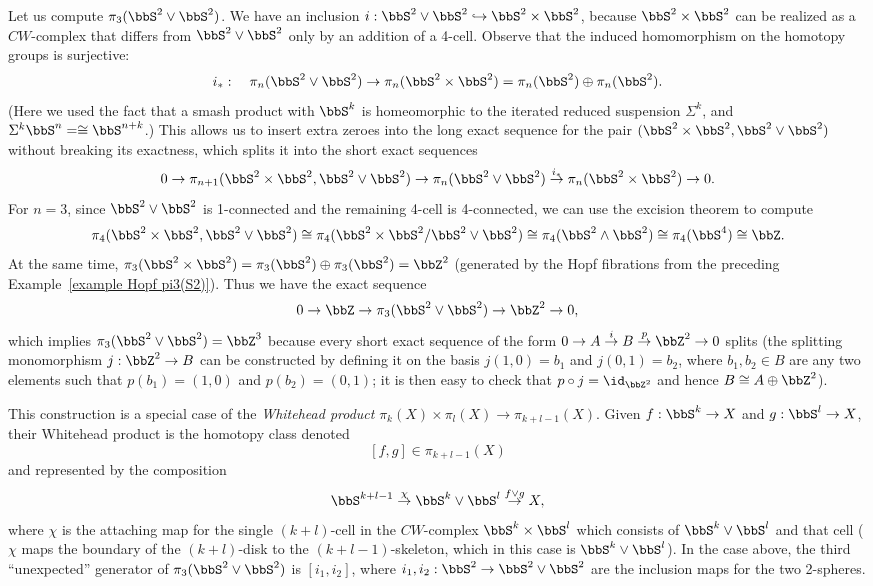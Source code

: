 \begin{example}
    Let us compute $\pi_3(\bbS^2\vee \bbS^2)$. We have an inclusion $i: \bbS^2\vee \bbS^2\hookrightarrow \bbS^2\times \bbS^2$, because $\bbS^2\times \bbS^2$ can be realized as a $CW$-complex that differs from $\bbS^2\vee \bbS^2$ only by an addition of a 4-cell. Observe that the induced homomorphism on the homotopy groups is surjective:
    \[i_\ast: \quad \pi_n(\bbS^2\vee \bbS^2)\to \pi_n(\bbS^2\times \bbS^2)=\pi_n(\bbS^2)\oplus \pi_n(\bbS^2).\]
    (Here we used the fact that a smash product with $\bbS^k$ is homeomorphic to the iterated reduced suspension $\Sigma^k$, and $\Sigma^k \bbS^n=\cong \bbS^{n+k}$.) This allows us to insert extra zeroes into the long exact sequence for the pair $(\bbS^2\times \bbS^2,\bbS^2\vee \bbS^2)$ without breaking its exactness, which splits it into the short exact sequences
    \[0\to \pi_{n+1}(\bbS^2\times \bbS^2,\bbS^2\vee \bbS^2)\to \pi_n(\bbS^2\vee \bbS^2)\overset{i_\ast}{\to} \pi_n(\bbS^2\times \bbS^2)\to 0.\]
    For $n=3$, since $\bbS^2\vee \bbS^2$ is 1-connected and the remaining 4-cell is 4-connected, we can use the excision theorem to compute
    \[\pi_4(\bbS^2\times \bbS^2,\bbS^2\vee \bbS^2)\cong \pi_4(\bbS^2\times \bbS^2\slash \bbS^2\vee \bbS^2)\cong \pi_4(\bbS^2\wedge \bbS^2) \cong\pi_4(\bbS^4)\cong \bbZ.\]
    At the same time, $\pi_3(\bbS^2\times \bbS^2)=\pi_3(\bbS^2)\oplus \pi_3(\bbS^2)=\bbZ^2$ (generated by the Hopf fibrations from the preceding Example~\ref{example Hopf pi3(S2)}). Thus we have the exact sequence
    \[0\to \bbZ\to \pi_3(\bbS^2\vee \bbS^2)\to \bbZ^2\to 0,\]
    which implies $\pi_3(\bbS^2\vee \bbS^2)=\bbZ^3$ because every short exact sequence of the form $0\to A\overset{i}{\to} B\overset{p}{\to} \bbZ^2\to 0$ splits (the splitting monomorphism $j:\bbZ^2\to B$ can be constructed by defining it on the basis $j(1,0)=b_1$ and $j(0,1)=b_2$, where $b_1,b_2\in B$ are any two elements such that $p(b_1)=(1,0)$ and $p(b_2)=(0,1)$; it is then easy to check that $p\circ j=\id_{\bbZ^2}$ and hence $B\cong A\oplus \bbZ^2$).

    This construction is a special case of the \emph{Whitehead product} $\pi_k(X)\times\pi_l(X)\to \pi_{k+l-1}(X)$. Given $f:\bbS^k\to X$ and $g:\bbS^l\to X$, their Whitehead product is the homotopy class denoted
    \[[f,g]\in \pi_{k+l-1}(X)\]
    and represented by the composition 
    \[\bbS^{k+l-1}\overset{\chi}{\to} \bbS^k\vee \bbS^l\overset{f\vee g}{\to} X,\]
    where $\chi$ is the attaching map for the single $(k+l)$-cell in the $CW$-complex $\bbS^k\times \bbS^l$ which consists of $\bbS^k\vee \bbS^l$ and that cell ($\chi$ maps the boundary of the $(k+l)$-disk to the $(k+l-1)$-skeleton, which in this case is $\bbS^k\vee \bbS^l$). In the case above, the third ``unexpected'' generator of $\pi_3(\bbS^2\vee \bbS^2)$ is $[i_1,i_2]$, where $i_1,i_2:\bbS^2\to \bbS^2\vee \bbS^2$ are the inclusion maps for the two 2-spheres. 
    

\end{example}

